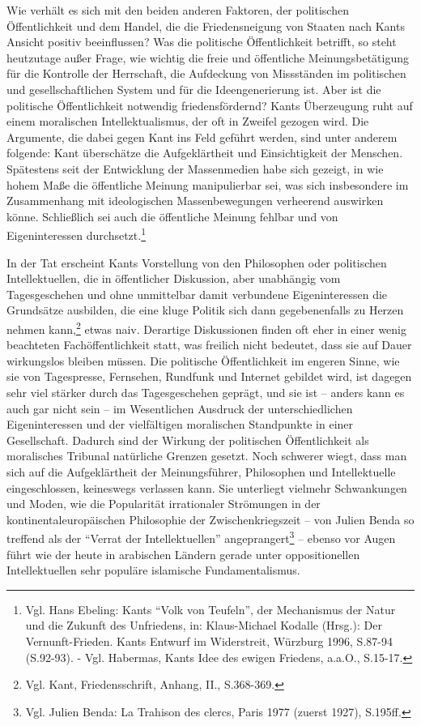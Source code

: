 \documentclass[12pt,a4paper,ngerman]{article}
\begin{document}
Wie verhält es sich mit den beiden anderen Faktoren, der politischen
Öffentlichkeit und dem Handel, die die Friedensneigung von Staaten
nach Kants Ansicht positiv beeinflussen? Was die politische
Öffentlichkeit betrifft, so steht heutzutage außer Frage, wie wichtig
die freie und öffentliche Meinungsbetätigung für die Kontrolle der
Herrschaft, die Aufdeckung von Missständen im politischen und
gesellschaftlichen System und für die Ideengenerierung ist. Aber ist
die politische Öffentlichkeit notwendig friedensfördernd? Kants
Überzeugung ruht auf einem moralischen Intellektualismus, der oft in
Zweifel gezogen wird. Die Argumente, die dabei gegen Kant ins Feld
geführt werden, sind unter anderem folgende: Kant überschätze die
Aufgeklärtheit und Einsichtigkeit der Menschen. Spätestens seit der
Entwicklung der Massenmedien habe sich gezeigt, in wie hohem Maße die
öffentliche Meinung manipulierbar sei, was sich insbesondere im
Zusammenhang mit ideologischen Massenbewegungen verheerend auswirken
könne. Schließlich sei auch die öffentliche Meinung fehlbar und von
Eigeninteressen durchsetzt.\footnote{Vgl. Hans Ebeling: Kants "`Volk
  von Teufeln"', der Mechanismus der Natur und die Zukunft des
  Unfriedens, in: Klaus-Michael Kodalle (Hrsg.): Der Vernunft-Frieden.
  Kants Entwurf im Widerstreit, Würzburg 1996, S.87-94 (S.92-93). -
  Vgl. Habermas, Kants Idee des ewigen Friedens, a.a.O., S.15-17.}

In der Tat erscheint Kants Vorstellung von den Philosophen oder
politischen Intellektuellen, die in öffentlicher Diskussion, aber
unabhängig vom Tagesgeschehen und ohne unmittelbar damit verbundene
Eigeninteressen die Grundsätze ausbilden, die eine kluge Politik sich
dann gegebenenfalls zu Herzen nehmen kann,\footnote{Vgl. Kant,
Friedensschrift, Anhang, II., S.368-369.}  etwas naiv. Derartige
Diskussionen finden oft eher in einer wenig beachteten
Fachöffentlichkeit statt, was freilich nicht bedeutet, dass sie auf
Dauer wirkungslos bleiben müssen. Die politische Öffentlichkeit im
engeren Sinne, wie sie von Tagespresse, Fernsehen, Rundfunk und
Internet gebildet wird, ist dagegen sehr viel stärker durch das
Tagesgeschehen geprägt, und sie ist -- anders kann es auch gar nicht
sein -- im Wesentlichen Ausdruck der unterschiedlichen Eigeninteressen
und der vielfältigen moralischen Standpunkte in einer Gesellschaft.
Dadurch sind der Wirkung der politischen Öffentlichkeit als
moralisches Tribunal natürliche Grenzen gesetzt. Noch schwerer wiegt,
dass man sich auf die Aufgeklärtheit der Meinungsführer, Philosophen
und Intellektuelle eingeschlossen, keineswegs verlassen kann. Sie
unterliegt vielmehr Schwankungen und Moden, wie die Popularität
irrationaler Strömungen in der kontinentaleuropäischen Philosophie der
Zwischenkriegszeit -- von Julien Benda so treffend als der "`Verrat
der Intellektuellen"' angeprangert\footnote{Vgl. Julien Benda: La
Trahison des clercs, Paris 1977 (zuerst 1927), S.195ff.} -- ebenso vor
Augen führt wie der heute in arabischen Ländern gerade unter
oppositionellen Intellektuellen sehr populäre islamische
Fundamentalismus.
\end{document}
